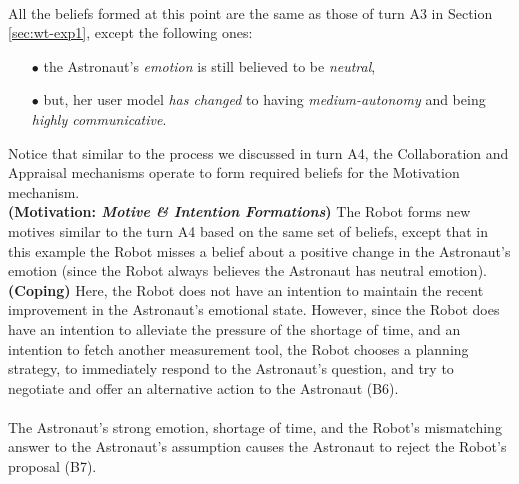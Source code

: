 \noindent{}\\

All the beliefs formed at this point are the same as those of turn A3 in Section
\ref{sec:wt-exp1}, except the following ones:

\begin{itemize}
  \item[$\bullet$] the Astronaut's \textit{emotion} is still
  believed to be \textit{neutral},
  \item[$\bullet$] but, her user model \textit{has changed} to having
  \textit{medium-autonomy} and being \textit{highly communicative}.
\end{itemize}

Notice that similar to the process we discussed in turn A4, the Collaboration
and Appraisal mechanisms operate to form required beliefs for the Motivation
mechanism.\\

\noindent\textbf{(Motivation: \textit{Motive \& Intention Formations})} The
Robot forms new motives similar to the turn A4 based on the same set of beliefs,
except that in this example the Robot misses a belief about a positive change in
the Astronaut's emotion (since the Robot always believes the Astronaut has
neutral emotion).\\

\noindent\textbf{(Coping)} Here, the Robot does not have an intention to
maintain the recent improvement in the Astronaut's emotional state. However,
since the Robot does have an intention to alleviate the pressure of the shortage
of time, and an intention to fetch another measurement tool, the Robot chooses a
planning strategy, to immediately respond to the Astronaut's question, and try
to negotiate and offer an alternative action to the Astronaut (B6).\\

\noindent{}\\

The Astronaut's strong emotion, shortage of time, and the Robot's mismatching
answer to the Astronaut's assumption causes the Astronaut to reject the Robot's
proposal (B7).\\

